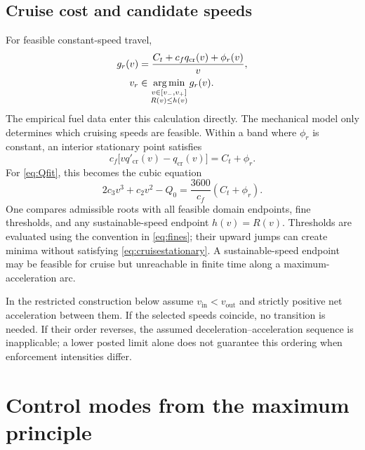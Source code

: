 \documentclass[conference,a4paper]{IEEEtran}
\newcommand{\argmin}{\operatorname*{arg\,min}}
\newcommand{\out}{\mathrm{out}}
\newcommand{\inn}{\mathrm{in}}
\newcommand{\cruise}{\mathrm{cr}}
\begin{document}
\subsection{Cruise cost and candidate speeds}
For feasible constant-speed travel,
\begin{align}
g_r(v)&=\frac{C_t+c_fq_{\cruise}(v)+\phi_r(v)}{v},\notag\\
v_r&\in\argmin_{\substack{v\in[v_-,v_+]\\R(v)\le h(v)}}g_r(v).
\label{eq:g}
\end{align}
The empirical fuel data enter this calculation directly. The mechanical model only determines which cruising speeds are feasible. Within a band where $\phi_r$ is constant, an interior stationary point satisfies
\begin{equation}
c_f\bigl[vq'_{\cruise}(v)-q_{\cruise}(v)\bigr]=C_t+\phi_r.
\label{eq:cruisestationary}
\end{equation}
For \eqref{eq:Qfit}, this becomes the cubic equation
\begin{equation}
2c_3v^3+c_2v^2-Q_0=\frac{3600}{c_f}(C_t+\phi_r).
\label{eq:cubic}
\end{equation}
One compares admissible roots with all feasible domain endpoints, fine thresholds, and any sustainable-speed endpoint $h(v)=R(v)$. Thresholds are evaluated using the convention in \eqref{eq:fines}; their upward jumps can create minima without satisfying \eqref{eq:cruisestationary}. A sustainable-speed endpoint may be feasible for cruise but unreachable in finite time along a maximum-acceleration arc.

In the restricted construction below assume $v_{\inn}<v_{\out}$ and strictly positive net acceleration between them. If the selected speeds coincide, no transition is needed. If their order reverses, the assumed deceleration--acceleration sequence is inapplicable; a lower posted limit alone does not guarantee this ordering when enforcement intensities differ.

\section{Control modes from the maximum principle}
\label{sec:pmp}
\end{document}
